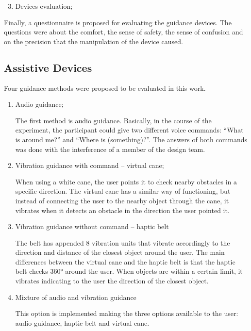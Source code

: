     \begin{enumerate} [3.]
        \setcounter{enumi}{2}
        \item Devices evaluation;
    \end{enumerate}

    Finally, a questionnaire is proposed for evaluating the guidance devices. The questions were about the comfort, the sense of safety, the sense of confusion and on the precision that the manipulation of the device caused.

    \subsection*{Assistive Devices}
    Four guidance methods were proposed to be evaluated in this work.
        
    \begin{enumerate} [1.]
        \item Audio guidance;
        
        The first method is audio guidance. Basically, in the course of the experiment, the participant could give two different voice commands: “What is around me?” and “Where is (something)?”. The answers of both commands was done with the interference of a member of the design team.  

        \item Vibration guidance with command – virtual cane;
        
        When using a white cane, the user points it to check nearby obstacles in a specific direction. The virtual cane has a similar way of functioning, but instead of connecting the user to the nearby object through the cane, it vibrates when it detects an obstacle in the direction the user pointed it.

        \item Vibration guidance without command – haptic belt
        
        The belt has appended 8 vibration units that vibrate accordingly to the direction and distance of the closest object around the user. The main differences between the virtual cane and the haptic belt is that the haptic belt checks 360° around the user. When objects are within a certain limit, it vibrates indicating to the user the direction of the closest object. 

        \item Mixture of audio and vibration guidance
        
        This option is implemented making the three options available to the user: audio guidance, haptic belt and virtual cane. 
    \end{enumerate}


